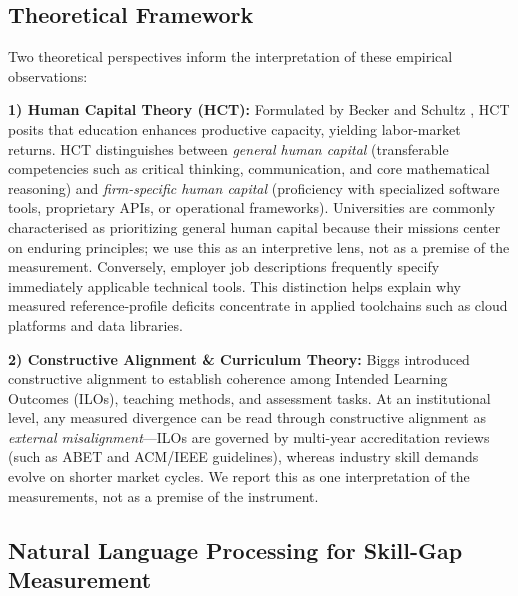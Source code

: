 \documentclass[journal]{IEEEtran}
\begin{document}
\subsection{Theoretical Framework}
\label{sec:theory}

Two theoretical perspectives inform the interpretation of these empirical observations:

\textbf{1) Human Capital Theory (HCT):} Formulated by Becker \cite{becker1964human} and Schultz \cite{schultz1961investment}, HCT posits that education enhances productive capacity, yielding labor-market returns. HCT distinguishes between \textit{general human capital} (transferable competencies such as critical thinking, communication, and core mathematical reasoning) and \textit{firm-specific human capital} (proficiency with specialized software tools, proprietary APIs, or operational frameworks). Universities are commonly characterised as prioritizing general human capital because their missions center on enduring principles; we use this as an interpretive lens, not as a premise of the measurement. Conversely, employer job descriptions frequently specify immediately applicable technical tools. This distinction helps explain why measured reference-profile deficits concentrate in applied toolchains such as cloud platforms and data libraries.

\textbf{2) Constructive Alignment \& Curriculum Theory:} Biggs \cite{biggs1996enhancing} introduced constructive alignment to establish coherence among Intended Learning Outcomes (ILOs), teaching methods, and assessment tasks. At an institutional level, any measured divergence can be read through constructive alignment as \textit{external misalignment}---ILOs are governed by multi-year accreditation reviews (such as ABET and ACM/IEEE guidelines), whereas industry skill demands evolve on shorter market cycles. We report this as one interpretation of the measurements, not as a premise of the instrument.

\subsection{Natural Language Processing for Skill-Gap Measurement}
\end{document}
